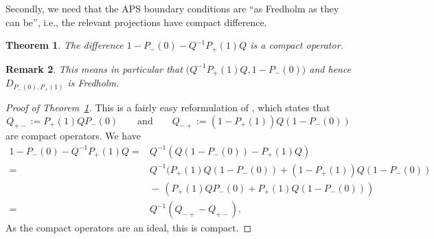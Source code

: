 \documentclass[pdftex]{sigma}
\numberwithin{equation}{section}
\newtheorem{Theorem}{Theorem}[section]
\newtheorem{Remark}[Theorem]{Remark} }
\begin{document}
	Secondly, we need that the APS boundary conditions are ``as Fredholm as they can be'', i.e., the relevant projections have compact difference.
	\begin{Theorem}	\label{APScomp}
		The difference
$1-P_-(0)-Q^{-1}P_+(1)Q$
		is a compact operator.
	\end{Theorem}
	\begin{Remark}
		This means in particular that $\bigl(Q^{-1}P_+(1)Q,1-P_-(0)\bigr)$ and hence $D_{P_-(0),P_+(1)}$ is Fredholm.
	\end{Remark}
	\begin{proof}[Proof of Theorem~\ref{APScomp}]
		This is a fairly easy reformulation of \cite[Lemma 2.6]{BSglobal}, which states that
		\[Q_{+-}:=P_+(1)QP_-(0)\qquad \text{and}\qquad Q_{-+}:=(1-P_+(1))Q(1-P_-(0))\]
		are compact operators.
		We have
		\begin{align*}
			1-P_-(0)-Q^{-1}P_+(1)Q={}&Q^{-1}(Q(1-P_-(0))-P_+(1)Q)\\
            ={}&Q^{-1}(P_+(1)Q(1-P_-(0))+(1-P_+(1))Q(1-P_-(0))\\
			&{}{-}\,(P_+(1)QP_-(0)+P_+(1)Q(1-P_-(0)))\\
			={}&Q^{-1}(Q_{-+}-Q_{+-}).
		\end{align*}
		As the compact operators are an ideal, this is compact.
	\end{proof}
\end{document}
